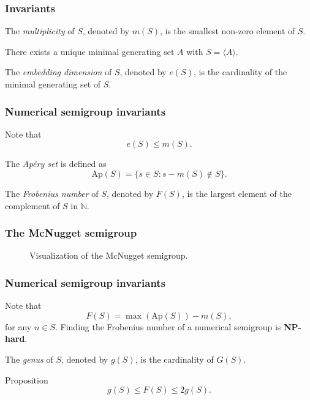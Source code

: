 \documentclass{beamer}
\def\NN{\ensuremath{\mathbb{N}}}
\begin{document}
\begin{frame}
\frametitle{Invariants}
\begin{definition}\label{def:smgps:multiplicity}
    The \textit{multiplicity} of $S$, denoted by $m(S)$, is the smallest non-zero element of $S$.
\end{definition}
\begin{theorem}\label{thm:smgps:minimal_generating_set}
    There exists a unique minimal generating set $A$ with $S = \langle A \rangle$.
\end{theorem}
\begin{definition}\label{def:smgps:embedding_dim}
    The \textit{embedding dimension} of $S$, denoted by $e(S)$, is the cardinality of the minimal generating set of $S$.
\end{definition}

\end{frame}   

\begin{frame}
\frametitle{Numerical semigroup invariants}
Note that
\[e(S) \leq m(S).\]
\begin{definition}\label{def:smgps:aperyset}
    The \textit{Ap\'ery set} is defined as
    \[\mathrm{Ap}(S) = \{s \in S : s - m(S) \notin S\}.\]
\end{definition}

\begin{definition}\label{def:smgps:frobeniusnum}
    The \textit{Frobenius number} of $S$, denoted by $F(S)$, is the largest element of the complement of $S$ in $\NN$.
\end{definition}
\end{frame}

\begin{frame}
    \frametitle{The McNugget semigroup}
    \begin{figure}
        \centering
        
        \caption{Visualization of the McNugget semigroup.}
    \end{figure}
\end{frame}


\begin{frame}
    \frametitle{Numerical semigroup invariants}
    
    Note that
\begin{equation*}\label{eq:smgps:selmer1}
    F(S) = \max (\mathrm{Ap}(S)) - m(S),
\end{equation*}
for any $n \in S$. Finding the Frobenius number of a numerical semigroup is \textbf{NP-hard}.
    \begin{definition}\label{def:smgps:genus}
        The \textit{genus} of $S$, denoted by $g(S)$, is the cardinality of $G(S)$.
    \end{definition}
    \begin{block}{Proposition}
        \[g(S) \leq F(S) \leq 2g(S).\]
    \end{block}
\end{frame}
\end{document}

